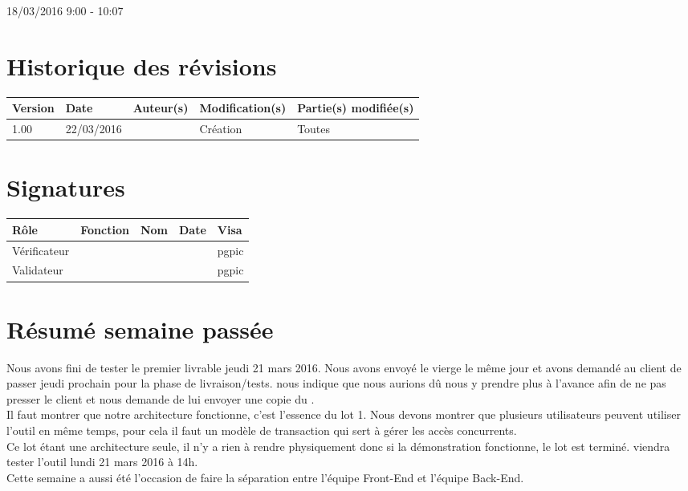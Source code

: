 \documentclass [a4paper] {article}
\begin{document}
18/03/2016			 				%
\hfill   
\hfill 	 9:00 - 10:07 				%


\section*{Historique des révisions}
\begin{center}
			\begin{tabular}{| p{2.5cm} | p{3cm} | p{3cm} | p{3cm} | p{3.5cm} |}
				\hline
				\rowcolor{Gray}
				Version & Date & Auteur(s) & Modification(s) & Partie(s) modifiée(s)		 \\
				\hline
				1.00 & 22/03/2016 & \Pierre & Création & Toutes \\
		\hline		
			\end{tabular}
		\end{center}

\section*{Signatures}

		\begin{center}
			\begin{tabular}{| p{2.5cm} | p{4cm} | p{3cm} | p{3cm} | p{2.5cm} |}
				\hline
				\rowcolor{Gray}
				Rôle & Fonction & Nom & Date & Visa		 \\
				\hline
				Vérificateur & \RQA & \Kafui &  & pgpic \\[30pt]
				\hline
				Validateur & \CP & \Sergi &  & pgpic \\[30pt]	
				\hline
			\end{tabular}
		\end{center}


\section{Résumé semaine passée}
Nous avons fini de tester le premier livrable jeudi 21 mars 2016. Nous avons envoyé le \CDR{} vierge le même jour et avons demandé au client de passer jeudi prochain pour la phase de livraison/tests. \nomTuteurPedago{} nous indique que nous aurions dû nous y prendre plus à l'avance afin de ne pas presser le client et nous demande de lui envoyer une copie du \CDR{}. \\
Il faut montrer que notre architecture fonctionne, c'est l'essence du lot 1. Nous devons montrer que plusieurs utilisateurs peuvent utiliser l'outil en même temps, pour cela il faut un modèle de transaction qui sert à gérer les accès concurrents. \\
Ce lot étant une architecture seule, il n'y a rien à rendre physiquement donc si la démonstration fonctionne, le lot est terminé. \nomTuteurPedago{} viendra tester l'outil lundi 21 mars 2016 à 14h. \\
Cette semaine a aussi été l'occasion de faire la séparation entre l'équipe Front-End et l'équipe Back-End.
\end{document}
